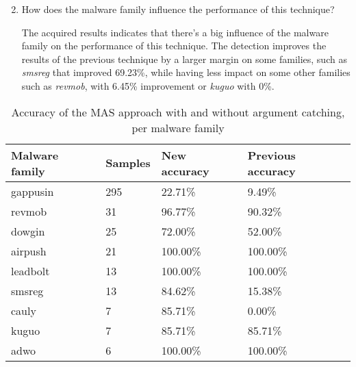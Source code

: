 \begin{enumerate}
    \setcounter{enumi}{1}
    \item How does the malware family influence the performance of this technique?

    The acquired results indicates that there's a big influence of the malware family on the performance of this technique. The detection improves the results of the previous technique by a larger margin on some families, such as \textit{smsreg} that improved 69.23\%, while having less impact on some other families such as \textit{revmob}, with 6.45\% improvement or \textit{kuguo} with 0\%.
\end{enumerate}


\begin{table}[]
\fontsize{12pt}{12pt}\selectfont
\centering
\caption{Accuracy of the MAS approach with and without argument catching, per malware family}
\label{tab:per-family-results}
\begin{tabular}{|l|l|l|l|}
\hline
\textbf{Malware family} & \textbf{Samples} & \textbf{New accuracy} & \textbf{Previous accuracy} \\ \hline
gappusin                & 295              & 22.71\%               & 9.49\%                     \\ \hline
revmob                  & 31               & 96.77\%               & 90.32\%                    \\ \hline
dowgin                  & 25               & 72.00\%               & 52.00\%                    \\ \hline
airpush                 & 21               & 100.00\%              & 100.00\%                   \\ \hline
leadbolt                & 13               & 100.00\%              & 100.00\%                   \\ \hline
smsreg                  & 13               & 84.62\%               & 15.38\%                    \\ \hline
cauly                   & 7                & 85.71\%               & 0.00\%                     \\ \hline
kuguo                   & 7                & 85.71\%               & 85.71\%                    \\ \hline
adwo                    & 6                & 100.00\%              & 100.00\%                   \\ \hline

\end{tabular}
\end{table}
